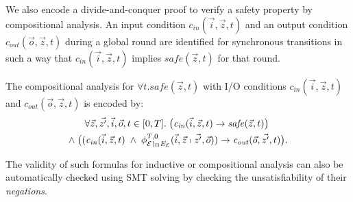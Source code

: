 We also encode a divide-and-conquer proof
to verify a safety property by compositional analysis. %
An input condition $\mathit{c}_\mathit{in}(\vec{i},\vec{z},t)$
and an output condition $\mathit{c}_\mathit{out}(\vec{o},\vec{z},t)$ 
during a global round
are identified for synchronous transitions
in such a way 
that $\mathit{c}_\mathit{in}(\vec{i},\vec{z},t)$ implies %
$\mathit{safe}(\vec{z},t)$ for that round.


\begin{definition} The compositional analysis for $\forall t.  \mathit{safe}(\vec{z},t)$
with I/O conditions $\mathit{c}_\mathit{in}(\vec{i},\vec{z},t)$ and $\mathit{c}_\mathit{out}(\vec{o},\vec{z},t)$
is encoded by:
\begin{multline*}
\forall \vec{z}, \vec{z'}, \vec{i}, \vec{o}, t \in [0,T].\;
\big(\mathit{c}_\mathit{in}(\vec{i},\vec{z},t) \rightarrow \mathit{safe}(\vec{z},t) \big)
\phantom{.}
\\
\wedge\;
\big(
(\mathit{c}_\mathit{in}(\vec{i},\vec{z},t)
\;\wedge\;
\phi_{\mathcal{E} \restriction_{\Pi} E_\mathcal{E}}^{T,0}(
	\vec{i}, \vec{z}
	\shortmid 
	\vec{z'}, \vec{o})
)
\rightarrow
\mathit{c}_\mathit{out}(\vec{o},\vec{z'},t)\big).
\end{multline*}
\end{definition}

The validity of such formulas for inductive or compositional  analysis can also be automatically checked 
using SMT solving
by checking the unsatisfiability of their \emph{negations}.









